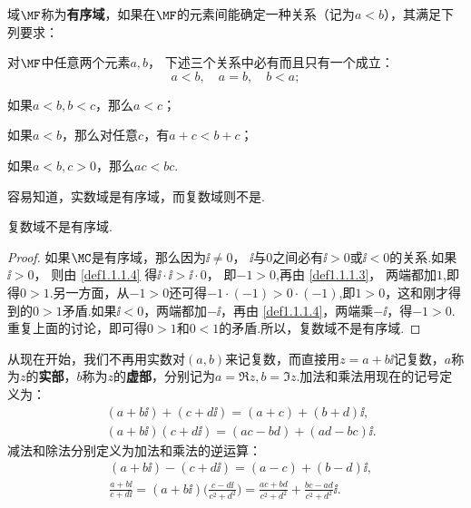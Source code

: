 \begin{definition}\label{def1.1.1}
域$\MF$称为\textbf{有序域}，如果在$\MF$的元素间能确定一种关系（记为$a<b$），其满足下列要求：
\begin{eenum}
  \item \label{def1.1.1.1}对$\MF$中任意两个元素$a,b$， 下述三个关系中必有而且只有一个成立：
  \[a<b,\quad a=b,\quad b<a;\]
  \item \label{def1.1.1.2}如果$a<b,b<c$，那么$a<c$；
  \item \label{def1.1.1.3}如果$a<b$，那么对任意$c$，有$a+c<b+c$；
  \item \label{def1.1.1.4}如果$a<b,c>0$，那么$ac<bc$.
\end{eenum}
\end{definition}
容易知道，实数域是有序域，而复数域则不是.
\begin{theorem}\label{thm1.1.2}
复数域不是有序域.
\end{theorem}
\begin{proof}
如果$\MC$是有序域，那么因为$\ii\ne0$， $\ii$与$0$之间必有$\ii>0$或$\ii<0$的关系.如果$\ii>0$， 则由 \ref{def1.1.1.4} 得$\ii\cdot\ii>\ii\cdot0$， 即$-1>0$,再由 \ref{def1.1.1.3}， 两端都加$1$,即得$0>1$.另一方面，从$-1>0$还可得$-1\cdot(-1)>0\cdot(-1)$,即$1>0$，这和刚才得到的$0>1$矛盾.如果$\ii<0$，两端都加$-\ii$，再由 \ref{def1.1.1.4}，两端乘$-\ii$，得$-1>0$.重复上面的讨论，即可得$0>1$和$0<1$的矛盾.所以，复数域不是有序域.
\end{proof}

从现在开始，我们不再用实数对$(a,b)$来记复数，而直接用$z=a+b\ii$记复数，$a$称为$z$的\textbf{实部}，$b$称为$z$的\textbf{虚部}，分别记为$a=\Re z,b=\Im z$.加法和乘法用现在的记号定义为：
\begin{align*}
&(a+b\ii)+(c+d\ii)=(a+c)+(b+d)\ii,\\
&(a+b\ii)(c+d\ii)=(ac-bd)+(ad-bc)\ii.
\end{align*}
减法和除法分别定义为加法和乘法的逆运算：
\begin{align*}
&(a+b\ii)-(c+d\ii)=(a-c)+(b-d)\ii,\\
&\frac{a+b\ii}{c+d\ii}=(a+b\ii)\bigg(\frac{c-d\ii}{c^2+d^2}\bigg)
=\frac{ac+bd}{c^2+d^2}+\frac{bc-ad}{c^2+d^2}\ii.
\end{align*}

